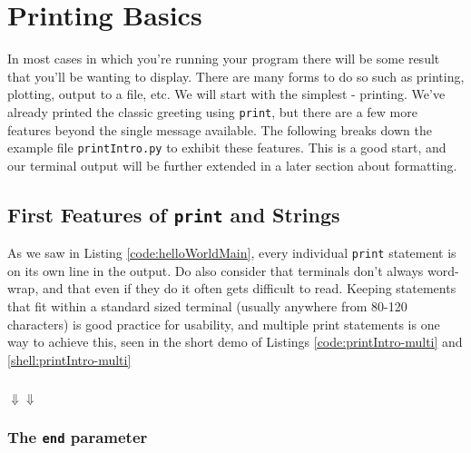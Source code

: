 \documentclass{book}
\newcommand{\pythonSub}[5]{
    \usemintedstyle{autumn}
    \begin{listing}[htb]
        \begin{mdframed}[backgroundcolor=codebg]
            \inputminted[firstline=#2, lastline=#3, linenos]{python}{#1}
        \end{mdframed}
        \caption{#4}
        \label{#5}
    \end{listing}
}
\newcommand{\shellSub}[5]{
    \begin{listing}[htb]
        \begin{mdframed}[backgroundcolor=codebg]
              
        \end{mdframed}
        \caption{#4}
        \label{#5}
    \end{listing}
}
\newcommand{\pythonAndShellSub}[8]{
\usemintedstyle{autumn}
    \begin{listing}[htb]
 	   \begin{mdframed}[backgroundcolor=codebg]
            \inputminted[firstline=#2, lastline=#3, linenos]{python}{#1}
        \end{mdframed}
        \hspace{5em}$\Downarrow$\hfill$\Downarrow$\hspace{5em}
        \begin{mdframed}[backgroundcolor=codebg]
              
        \end{mdframed}
        \caption{#7}
        \label{#8}
    \end{listing}
}
\begin{document}
\section{Printing Basics}\label{sec:printBasics}

In most cases in which you're running your program there will be some result that you'll be wanting to display. There are many forms to do so such as printing, plotting, output to a file, etc. We will start with the simplest - printing. We've already printed the classic greeting using \texttt{print}, but there are a few more features beyond the single message available. The following breaks down the example file \texttt{printIntro.py} to exhibit these features. This is a good start, and our terminal output will be further extended in a later section about formatting.

\subsection{First Features of \texttt{print} and Strings}\label{sec:printFeatures}

As we saw in Listing \ref{code:helloWorldMain}, every individual \texttt{print} statement is on its own line in the output. Do also consider that terminals don't always word-wrap, and that even if they do it often gets difficult to read. Keeping statements that fit within a standard sized terminal (usually anywhere from 80-120 characters) is good practice for usability, and multiple print statements is one way to achieve this, seen in the short demo of Listings \ref{code:printIntro-multi} and \ref{shell:printIntro-multi}


%

\pythonAndShellSub{../../../docCode/chapter2/section2/printIntro.py}
{1}{4}
{../../../docCode/chapter2/section2/printIntro.txt}
{1}{3}
{}
{pyshell:printIntro-multi}

\subsubsection{The \texttt{end} parameter}\label{sec:printEnd}
\end{document}
